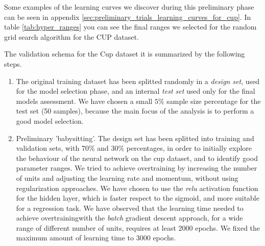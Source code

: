 \documentclass[11pt,twoside]{article}
\begin{document}
        Some examples of the learning curves we discover during this preliminary phase can be seen in appendix
        \ref{sec:preliminary_trials_learning_curves_for_cup}. In table \ref{tab:hyper_ranges} you can see the
        final ranges we selected for the random grid search algorithm for the CUP dataset.

\newpage
The validation schema for the Cup dataset it is summarized by the following steps.

\begin{enumerate}
\item The original training dataset has been splitted randomly in a \textit{design set}, used for the model selection phase, and an internal \textit{test set} used only for the final models assessment.
  We have chosen a small $5\%$ sample size percentage for the test set (50 samples), because the main focus of the analysis is to perform a good model selection. %
\item Preliminary 'babysitting'. The design set has been splitted into training and validation sets, with $70\%$ and $30\%$ percentages, in order to initially explore the behaviour of the neural network on the cup dataset, and to identify good parameter ranges. We tried to achieve overtraining by increasing the number of units and adjusting the learning rate and momentum, without using regularization approaches. We have chosen to use the \textit{relu} activation function for the hidden layer, which is faster respect to the sigmoid, and more suitable for a regression task.
  We have observed that the learning time needed to achieve overtrainingwith the \textit{batch} gradient descent approach, for a wide range of different number of units, requires at least 2000 epochs. We fixed the maximum amount of learning time to 3000 epochs.


\end{enumerate}
\end{document}
